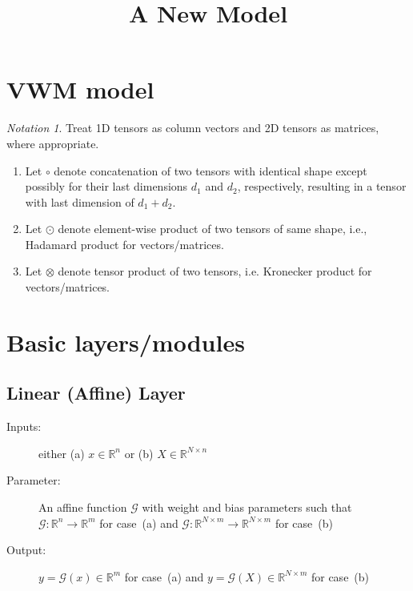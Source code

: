 \documentclass{article}
\title{A New Model}
\author{}
\theoremstyle{remark}
\newtheorem*{notation}{Notation}
\theoremstyle{definition}
\newcommand{\Reals}{\mathbb{R}}
\newcommand{\cG}{\mathcal{G}}
\begin{document}
\maketitle

\section{VWM model}

\begin{notation}
Treat 1D tensors as column vectors and 2D tensors as matrices, where appropriate.
\begin{enumerate}
	\item  Let $\circ$ denote concatenation of two tensors with identical shape except possibly
	for their last dimensions $d_1$ and $d_2$, respectively,  
	resulting in a tensor with last dimension of $d_1+d_2$. 
	
	\item Let $\odot$ denote  element-wise product of two tensors of same shape,
	i.e., Hadamard product for vectors/matrices.
	
	\item Let $\otimes$ denote tensor product of two tensors, 
	i.e. Kronecker product for vectors/matrices.
\end{enumerate}
\end{notation}	

\section{Basic layers/modules}

\subsection{Linear (Affine) Layer}
\begin{description}
	\item[Inputs:] either (a) $x \in \Reals^n$ or (b) $X \in  \Reals^{N \times n}$	
	\item[Parameter:] An affine function $\cG$ with weight and bias parameters such that
	$\cG: \Reals^n \to \Reals^m$ for case~(a)
	and $\cG: \Reals^{N \times m} \to \Reals^{N \times m}$ for case~(b)
		
	\item[Output:] $y = \cG(x)  \in \Reals^m$  for case~(a) 
		and $y = \cG(X) \in \Reals^{N \times m}$ for case~(b)
\end{description}
\end{document}

